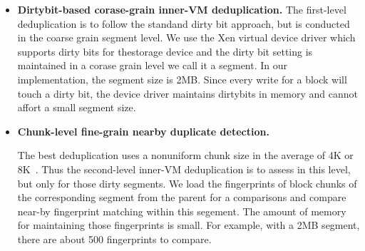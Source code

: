 \begin{itemize}
\item \textbf{Dirtybit-based corase-grain inner-VM deduplication.}
The first-level deduplication is to follow the standand dirty bit approach, but is conducted
in the coarse grain segment level.
We use the  Xen virtual device driver which supports dirty bits for thestorage device
and the dirty bit setting is maintained in a corase grain level we call it a segment.
In our implementation, the segment size is 2MB. 
Since every write for a block will touch a dirty bit, the device driver maintains dirtybits in memory
and cannot affort a small segment  size.

\item \textbf{Chunk-level fine-grain nearby duplicate detection.}

The best deduplication uses a nonuniform chunk size 
in the average of 4K or 8K~\cite{??}.
Thus the second-level inner-VM deduplication is to assess in this
level, but only for those dirty  segments. 
We load the fingerprints of block chunks of the corresponding segment from the
parent for a comparisons and compare near-by fingerprint matching within this segement.
The amount of memory for maintaining those fingerprints  is small.
For example, with a 2MB segment, there are about 500 fingerprints to compare.


%

%


\end{itemize}

